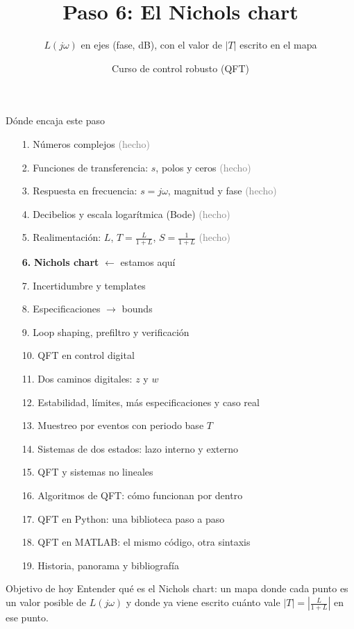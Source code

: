 \documentclass[aspectratio=169,11pt]{beamer}
\title[Nichols chart]{Paso 6: El Nichols chart}
\subtitle{$L(j\omega)$ en ejes (fase, dB), con el valor de $|T|$ escrito en el mapa}
\author{Curso de control robusto (QFT)}
\date{}
\begin{document}
\begin{frame}\titlepage\end{frame}

\begin{frame}{Dónde encaja este paso}
  \tiny
  \begin{enumerate}\setlength{\itemsep}{-2pt}
    \item[1.] Números complejos \hfill \textcolor{gray}{(hecho)}
    \item[2.] Funciones de transferencia: $s$, polos y ceros \hfill \textcolor{gray}{(hecho)}
    \item[3.] Respuesta en frecuencia: $s=j\omega$, magnitud y fase \hfill \textcolor{gray}{(hecho)}
    \item[4.] Decibelios y escala logarítmica (Bode) \hfill \textcolor{gray}{(hecho)}
    \item[5.] Realimentación: $L$, $T=\frac{L}{1+L}$, $S=\frac{1}{1+L}$ \hfill \textcolor{gray}{(hecho)}
    \item[\textbf{6.}] \textbf{Nichols chart} \hfill $\leftarrow$ estamos aquí
    \item[7.] Incertidumbre y templates
    \item[8.] Especificaciones $\rightarrow$ bounds
    \item[9.] Loop shaping, prefiltro y verificación
    \item[10.] QFT en control digital
    \item[11.] Dos caminos digitales: $z$ y $w$
    \item[12.] Estabilidad, límites, más especificaciones y caso real
    \item[13.] Muestreo por eventos con periodo base $T$
    \item[14.] Sistemas de dos estados: lazo interno y externo
    \item[15.] QFT y sistemas no lineales
    \item[16.] Algoritmos de QFT: cómo funcionan por dentro
    \item[17.] QFT en Python: una biblioteca paso a paso
    \item[18.] QFT en MATLAB: el mismo código, otra sintaxis
    \item[19.] Historia, panorama y bibliografía
  \end{enumerate}
  \vspace{4pt}
  \begin{block}{Objetivo de hoy}
    Entender qué es el Nichols chart: un mapa donde cada punto es un valor posible de $L(j\omega)$ y donde ya viene escrito cuánto vale $|T|=\left|\frac{L}{1+L}\right|$ en ese punto.
  \end{block}
\end{frame}
\end{document}
